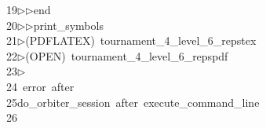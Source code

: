 \begin{tabbing}
19\>$\triangleright$\>$\triangleright$\>end\ \\[0pt]
20\>$\triangleright$\>$\triangleright$\>print\_symbols\\[0pt]
21\>$\triangleright$\>(PDFLATEX)\ tournament\_4\_level\_6\_repstex\\[0pt]
22\>$\triangleright$\>(OPEN)\ tournament\_4\_level\_6\_repspdf\\[0pt]
23\>$\triangleright$\>\\[0pt]
24\>\ error\ after\\[0pt]
25\>do\_orbiter\_session\ after\ execute\_command\_line\\[0pt]
26\>\end{tabbing}
